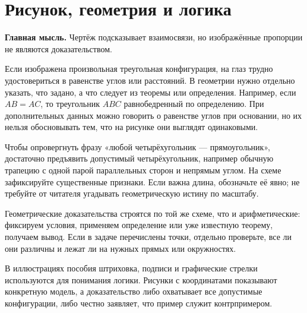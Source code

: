 \documentclass[11pt,a4paper,openany]{book}
\begin{document}
\medskip

\section{Рисунок, геометрия и логика}\label{theory:10}

\begin{keybox}\textbf{Главная мысль.} Чертёж подсказывает взаимосвязи, но изображённые пропорции не являются доказательством.\end{keybox}

Если изображена произвольная треугольная конфигурация, на глаз трудно удостовериться в равенстве углов или расстояний. В геометрии нужно отдельно указать, что задано, а что следует из теоремы или определения. Например, если $AB=AC$, то треугольник $ABC$ равнобедренный по определению. При дополнительных данных можно говорить о равенстве углов при основании, но их нельзя обосновывать тем, что на рисунке они выглядят одинаковыми.


Чтобы опровергнуть фразу «любой четырёхугольник — прямоугольник», достаточно предъявить допустимый четырёхугольник, например обычную трапецию с одной парой параллельных сторон и непрямым углом. На схеме зафиксируйте существенные признаки. Если важна длина, обозначьте её явно; не требуйте от читателя угадывать геометрическую истину по масштабу.


Геометрические доказательства строятся по той же схеме, что и арифметические: фиксируем условия, применяем определение или уже известную теорему, получаем вывод. Если в задаче перечислены точки, отдельно проверьте, все ли они различны и лежат ли на нужных прямых или окружностях.


В иллюстрациях пособия штриховка, подписи и графические стрелки используются для понимания логики. Рисунки с координатами показывают конкретную модель, а доказательство либо охватывает все допустимые конфигурации, либо честно заявляет, что пример служит контрпримером.


\begin{center}
\end{center}
\end{document}
